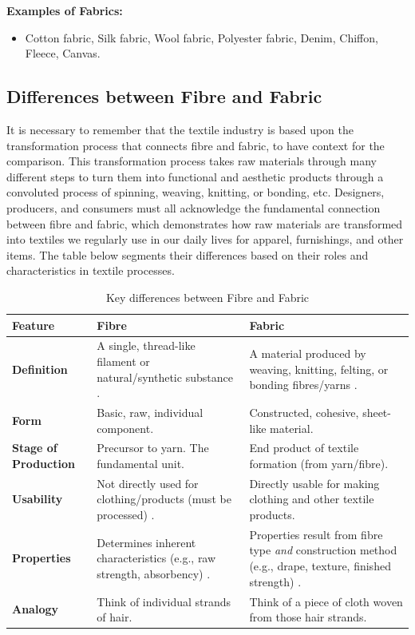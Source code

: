 \textbf{Examples of Fabrics:}
\begin{itemize}[noitemsep, topsep=0pt]
    \item Cotton fabric, Silk fabric, Wool fabric, Polyester fabric, Denim, Chiffon, Fleece, Canvas.
\end{itemize}

\subsection{Differences between Fibre and Fabric}

It is necessary to remember that the textile industry is based upon the transformation process that connects fibre and fabric, to have context for the comparison. This transformation process takes raw materials through many different steps to turn them into functional and aesthetic products through a convoluted process of spinning, weaving, knitting, or bonding, etc. Designers, producers, and consumers must all acknowledge the fundamental connection between fibre and fabric, which demonstrates how raw materials are transformed into textiles we regularly use in our daily lives for apparel, furnishings, and other items. The table below segments their differences based on their roles and characteristics in textile processes.

\newpage

\begin{table}[h!]
    \centering
    \caption{Key differences between Fibre and Fabric}
    \label{tab:fibre_fabric_diff}
    \begin{tabular}{l p{5cm} p{5cm}} %
        \toprule
        \textbf{Feature} & \textbf{Fibre} & \textbf{Fabric} \\
        \midrule
        \textbf{Definition} & A single, thread-like filament or natural/synthetic substance \cite{researchgate}. & A material produced by weaving, knitting, felting, or bonding fibres/yarns \cite{researchgate, hong2024research}. \\
        \textbf{Form} & Basic, raw, individual component. & Constructed, cohesive, sheet-like material. \\
        \textbf{Stage of Production} & Precursor to yarn. The fundamental unit. & End product of textile formation (from yarn/fibre). \\
        \textbf{Usability} & Not directly used for clothing/products (must be processed) \cite{researchgate}. & Directly usable for making clothing and other textile products. \\
        \textbf{Properties} & Determines inherent characteristics (e.g., raw strength, absorbency) \cite{researchgate}. & Properties result from fibre type \textit{and} construction method (e.g., drape, texture, finished strength) \cite{researchgate, hong2024research}. \\
        \textbf{Analogy} & Think of individual strands of hair. & Think of a piece of cloth woven from those hair strands. \\
        \bottomrule
    \end{tabular}
\end{table}

